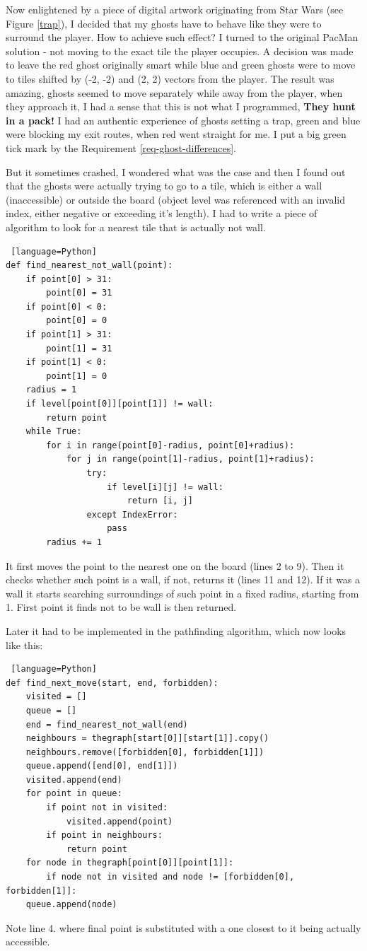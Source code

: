 \documentclass[11pt,a4paper]{report}
\begin{document}
					Now enlightened by a piece of digital artwork originating from Star Wars (see Figure \ref{trap}), I decided that my ghosts have to behave like they were to surround the player. How to achieve such effect? I turned to the original PacMan solution - not moving to the exact tile the player occupies. A decision was made to leave the red ghost originally smart while blue and green ghosts were to move to tiles shifted by (-2, -2) and (2, 2) vectors from the player. The result was amazing, ghosts seemed to move separately while away from the player, when they approach it, I had a sense that this is not what I programmed, \textbf{They hunt in a pack!} I had an authentic experience of ghosts setting a trap, green and blue were blocking my exit routes, when red went straight for me. I put a big green tick mark by the Requirement \ref{req-ghost-differences}.
					
					But it sometimes crashed, I wondered what was the case and then I found out that the ghosts were actually trying to go to a tile, which is either a wall (inaccessible) or outside the board (object level was referenced with an invalid index, either negative or exceeding it's length). I had to write a piece of algorithm to look for a nearest tile that is actually not wall.
					
					\begin{lstlisting} [language=Python]
def find_nearest_not_wall(point):
    if point[0] > 31:
        point[0] = 31
    if point[0] < 0:
        point[0] = 0
    if point[1] > 31:
        point[1] = 31
    if point[1] < 0:
        point[1] = 0
    radius = 1
    if level[point[0]][point[1]] != wall:
        return point
    while True:
        for i in range(point[0]-radius, point[0]+radius):
            for j in range(point[1]-radius, point[1]+radius):
                try:
                    if level[i][j] != wall:
                        return [i, j]
                except IndexError:
                    pass
        radius += 1
					\end{lstlisting}
					It first moves the point to the nearest one on the board (lines 2 to 9). Then it checks whether such point is a wall, if not, returns it (lines 11 and 12). If it was a wall it starts searching surroundings of such point in a fixed radius, starting from 1. First point it finds not to be wall is then returned.
					
					Later it had to be implemented in the pathfinding algorithm, which now looks like this:
					\begin{lstlisting} [language=Python]
def find_next_move(start, end, forbidden):
    visited = []
    queue = []
    end = find_nearest_not_wall(end)
    neighbours = thegraph[start[0]][start[1]].copy()
    neighbours.remove([forbidden[0], forbidden[1]])
    queue.append([end[0], end[1]])
    visited.append(end)
    for point in queue:
        if point not in visited:
            visited.append(point)
        if point in neighbours:
            return point
    for node in thegraph[point[0]][point[1]]:
        if node not in visited and node != [forbidden[0], forbidden[1]]:
    queue.append(node)
					\end{lstlisting}
					Note line 4. where final point is substituted with a one closest to it being actually accessible.
					
\end{document}
